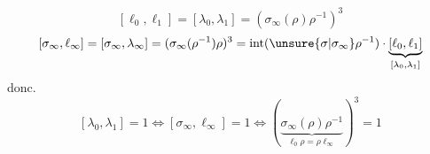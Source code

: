 \[
[\ell_0,\ell_1]=[\lambda_0,\lambda_1]=(\sigma_\infty(\rho)\rho^{-1})^3
\]
\[
[\sigma_\infty,\ell_\infty]=[\sigma_\infty,\lambda_\infty]=(\sigma_\infty(\rho^{-1})\rho)^3
=\operatorname{int}(\unsure{\sigma|\sigma_\infty}\rho^{-1})\cdot\underbrace{[\ell_0,\ell_1]}_{[\lambda_0,\lambda_1]}
\]
donc.
\[
[\lambda_0,\lambda_1]=1\Longleftrightarrow[\sigma_\infty,\ell_\infty]=1
\Longleftrightarrow(\underbrace{\sigma_\infty(\rho)\rho^{-1}}_{\ell_0\rho=\rho\ell_\infty})^3=1
\]
\margin{$\unsure{\Vert}$}
